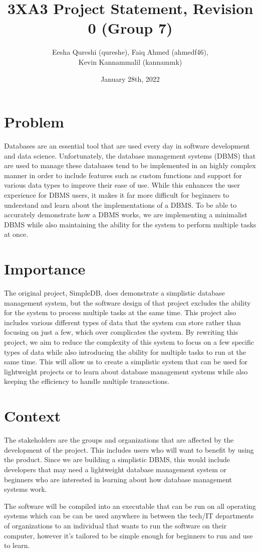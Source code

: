 \documentclass[12pt,letterpaper]{article}
\title{3XA3 Project Statement, Revision 0 (Group 7)}
\author{Eesha Qureshi (qureshe), Faiq Ahmed (ahmedf46),\\ Kevin Kannammalil (kannammk)}
\date{January 28th, 2022}
\begin{document}
\maketitle

\section*{Problem}

Databases are an essential tool that are used every day in software development and data science. Unfortunately, the database management systems (DBMS) that are used to manage these databases tend to be implemented in an highly complex manner in order to include features such as custom functions and support for various data types to improve their ease of use. While this enhances the user experience for DBMS users, it makes it far more difficult for beginners to understand and learn about the implementations of a DBMS. To be able to accurately demonstrate how a DBMS works, we are implementing a minimalist DBMS while also maintaining the ability for the system to perform multiple tasks at once.

\section*{Importance}

The original project, SimpleDB, does demonstrate a simplistic database management system, but the software design of that project excludes the ability for the system to process multiple tasks at the same time. This project also includes various different types of data that the system can store rather than focusing on just a few, which over complicates the system. By rewriting this project, we aim to reduce the complexity of this system to focus on a few specific types of data while also introducing the ability for multiple tasks to run at the same time. This will allow us to create a simplistic system that can be used for lightweight projects or to learn about database management systems while also keeping the efficiency to handle multiple transactions.

\section*{Context}

The stakeholders are the groups and organizations that are affected by the development of the project. This includes users who will want to benefit by using the product. Since we are building a simplistic DBMS, this would include developers that may need a lightweight database management system or beginners who are interested in learning about how database management systems work. 

\noindent The software will be compiled into an executable that can be run on all operating systems which can be can be used anywhere in between the tech/IT departments of organizations to an individual that wants to run the software on their computer, however it's tailored to be simple enough for beginners to run and use to learn. 
\end{document}
